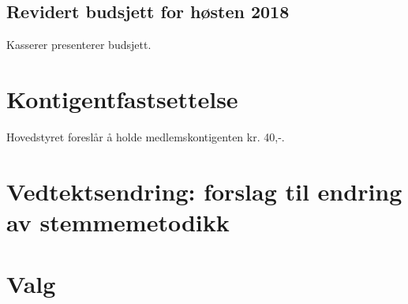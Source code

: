 \documentclass[10pt,norsk,a4paper]{article}
\begin{document}
\subsection{Revidert budsjett for høsten 2018}
Kasserer presenterer budsjett.


\section{Kontigentfastsettelse}
Hovedstyret foreslår å holde medlemskontigenten kr. 40,-.

\section{Vedtektsendring: forslag til endring av stemmemetodikk}

\section{Valg}
\end{document}
